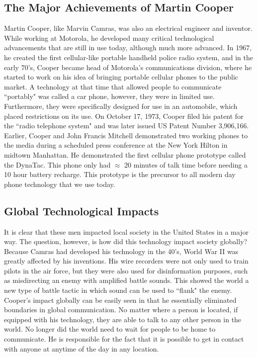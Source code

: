 \documentclass[12pt,letter]{article}
\begin{document}
\subsection{The Major Achievements of Martin Cooper}
Martin Cooper, like Marvin Camras, was also an electrical engineer and inventor. While working at Motorola, he developed many critical technological advancements that are still in use today, although much more advanced. In 1967, he created the first cellular-like portable handheld police radio system\cite{coop}, and in the early 70's, Cooper became head of Motorola's communications division, where he started to work on his idea of bringing portable cellular phones to the public market. A technology at that time that allowed people to communicate ``portably" was called a car phone, however, they were in limited use. Furthermore, they were specifically designed for use in an automobile, which placed restrictions on its use. On October 17, 1973, Cooper filed his patent for the ``radio telephone system" and was later issued US Patent Number 3,906,166\cite{radio}. Earlier, Cooper and John Francis Mitchell demonstrated two working phones to the media during a scheduled press conference at the New York Hilton in midtown Manhattan. He demonstrated the first cellular phone prototype called the DynaTac\cite{wiki:coop}. This phone only had $\approx$ 20 minutes of talk time before needing a 10 hour battery recharge. This prototype is the precursor to all modern day phone technology that we use today.
\subsection{Global Technological Impacts}
It is clear that these men impacted local society in the United States in a major way. The question, however, is how did this technology impact society globally? Because Camras had developed his technology in the 40's, World War II was greatly affected by his inventions. His wire recorders were not only used to train pilots in the air force, but they were also used for disinformation purposes, such as misdirecting an enemy with amplified battle sounds. This showed the world a new type of battle tactic in which sound can be used to ``flank" the enemy. Cooper's impact globally can be easily seen in that he essentially eliminated boundaries in global communication. No matter where a person is located, if equipped with his technology, they are able to talk to any other person in the world. No longer did the world need to wait for people to be home to communicate. He is responsible for the fact that it is possible to get in contact with anyone at anytime of the day in any location.
\end{document}
